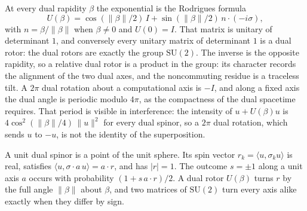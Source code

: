 \documentclass[a4paper]{article}
\begin{document}
At every dual rapidity $\beta$ the exponential is the Rodrigues formula
\[
U(\beta)
=\cos(\lVert\beta\rVert/2)\,I
+\sin(\lVert\beta\rVert/2)\,n\cdot(-i\sigma),
\]
with $n=\beta/\lVert\beta\rVert$ when $\beta\neq 0$ and $U(0)=I$. That matrix is unitary of determinant $1$, and conversely every unitary matrix of determinant $1$ is a dual rotor: the dual rotors are exactly the group $\mathrm{SU}(2)$. The inverse is the opposite rapidity, so a relative dual rotor is a product in the group: its character records the alignment of the two dual axes, and the noncommuting residue is a traceless tilt. A $2\pi$ dual rotation about a computational axis is $-I$, and along a fixed axis the dual angle is periodic modulo $4\pi$, as the compactness of the dual spacetime requires. That period is visible in interference: the intensity of $u+U(\beta)u$ is $4\cos^2(\lVert\beta\rVert/4)\,\lVert u\rVert^2$ for every dual spinor, so a $2\pi$ dual rotation, which sends $u$ to $-u$, is not the identity of the superposition.

A unit dual spinor is a point of the unit sphere. Its spin vector $r_k=\langle u,\sigma_k u\rangle$ is real, satisfies $\langle u,\sigma\cdot a\,u\rangle=a\cdot r$, and has $|r|=1$. The outcome $s=\pm1$ along a unit axis $a$ occurs with probability $(1+s\,a\cdot r)/2$. A dual rotor $U(\beta)$ turns $r$ by the full angle $\lVert\beta\rVert$ about $\beta$, and two matrices of $\mathrm{SU}(2)$ turn every axis alike exactly when they differ by sign.
\end{document}
